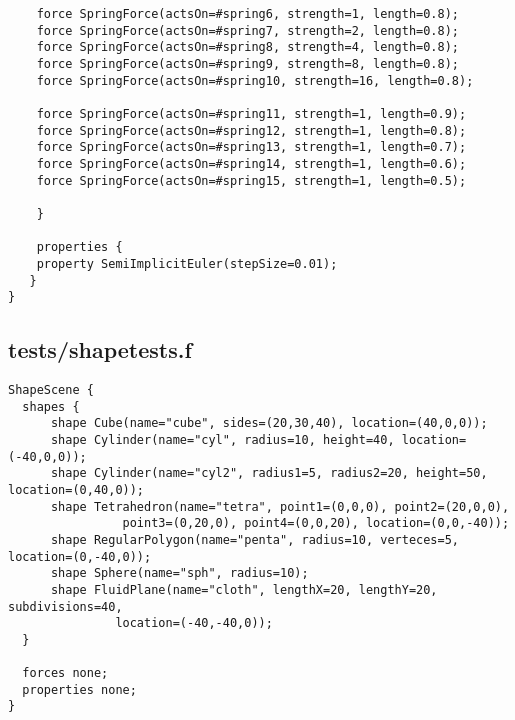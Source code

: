 \begin{lstlisting}
	force SpringForce(actsOn=#spring6, strength=1, length=0.8);
	force SpringForce(actsOn=#spring7, strength=2, length=0.8);
	force SpringForce(actsOn=#spring8, strength=4, length=0.8);
	force SpringForce(actsOn=#spring9, strength=8, length=0.8);
	force SpringForce(actsOn=#spring10, strength=16, length=0.8);

	force SpringForce(actsOn=#spring11, strength=1, length=0.9);
	force SpringForce(actsOn=#spring12, strength=1, length=0.8);
	force SpringForce(actsOn=#spring13, strength=1, length=0.7);
	force SpringForce(actsOn=#spring14, strength=1, length=0.6);
	force SpringForce(actsOn=#spring15, strength=1, length=0.5);

    }

    properties { 
	property SemiImplicitEuler(stepSize=0.01);
   }
}
\end{lstlisting}

\subsection*{tests/shapetests.f}
\begin{lstlisting}
ShapeScene {
  shapes {
      shape Cube(name="cube", sides=(20,30,40), location=(40,0,0));
      shape Cylinder(name="cyl", radius=10, height=40, location=(-40,0,0));
      shape Cylinder(name="cyl2", radius1=5, radius2=20, height=50, location=(0,40,0));
      shape Tetrahedron(name="tetra", point1=(0,0,0), point2=(20,0,0), 
      			point3=(0,20,0), point4=(0,0,20), location=(0,0,-40));
      shape RegularPolygon(name="penta", radius=10, verteces=5, location=(0,-40,0));
      shape Sphere(name="sph", radius=10);
      shape FluidPlane(name="cloth", lengthX=20, lengthY=20, subdivisions=40,
		       location=(-40,-40,0));
  }
  
  forces none;
  properties none;
}
\end{lstlisting}

